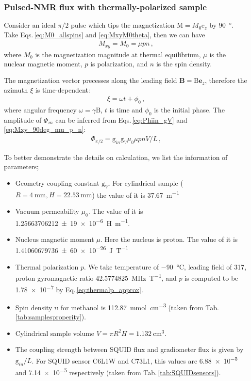 \subsubsection{Pulsed-NMR flux with thermally-polarized sample}

Consider an ideal $\pi/2$ pulse which tips the magnetization $\mathrm{M} = M_0 \mathrm{e}_z$ by \SI{90}{\degree}. Take Eqs.\,\eqref{eq:M0_allspins} and \eqref{eq:MxyM0theta}, then we can have
\begin{align}
    M_{xy} = M_0 = \mu p n\,,\label{eq:Mxy_90deg_mu_p_n}
\end{align}
where $M_0$ is the magnetization magnitude at thermal equilibrium, $\mu$ is the nuclear magnetic moment, $p$ is polarization, and $n$ is the spin density. 

The magnetization vector precesses along the leading field $\mathbf{B} = \mathrm{B} \mathbf{e}_z$, therefore the azimuth $\xi$ is time-dependent:
\begin{align}
    \xi = \omega t + \phi_0\,,
\end{align}
where angular frequency $\omega = \gamma \mathrm{B}$, $t$ is time and $\phi_0$ is the initial phase. The amplitude of $\Phi_{in}$ can be inferred from Eqs.\,\eqref{eq:Phiin_gV} and \eqref{eq:Mxy_90deg_mu_p_n}:
\begin{align}
	\Phi_{\pi/2} = \mathrm{g}_{in} \mathrm{g}_V \mu_0 \mu p n V / L\,, \label{eq:Phiin_gV_pNMR}
\end{align}

To better demonstrate the details on calculation, we list the information of parameters;
\begin{itemize}
    \item Geometry coupling constant $\mathrm{g}_V$. For cylindrical sample ($R=\SI{4}{\mm}, H=\SI{22.53}{\mm}$) the value of it is \SI{37.67}{\meter^{-1}}
    \item Vacuum permeability $\mu_0$. The value of it is \SI{1.256 637 062 12(19)e-6}{\henry.\metre^{-1}}\cite{FUNDAMENTALCONSTANTS}. 
    \item Nucleus magnetic moment $\mu$. Here the nucleus is proton. The value of it is \SI{1.410 606 797 36(60)e-26}{\joule.\tesla^{-1}}\cite{FUNDAMENTALCONSTANTS}
    \item Thermal polarization $p$. We take temperature of \SI{-90}{\celsius}, leading field of \SI{317}{\gauss}, proton gyromagnetic ratio \SI{42.577 482 5}{\MHz. \tesla^{-1}}\cite{rumble2019crc}, and $p$ is computed to be \SI{1.78e-7}{} by Eq.\,\eqref{eq:thermalp_approx}. 
    \item Spin density $n$ for methanol is \SI{112.87}{\mmol.\cm^{-3}} (taken from Tab.\,\ref{tab:samplesproperity}). 
    \item Cylindrical sample volume $V = \pi R^2 H = \SI{1.132}{\cm^{3}}$. 
    \item The coupling strength between SQUID flux and gradiometer flux is given by $\mathrm{g}_{in} / L$. For SQUID sensor C6L1W and C73L1, this values are \SI{6.88e-5}{} and \SI{7.14e-5}{} respectively (taken from Tab.\,\ref{tab:SQUIDsensors}). 
\end{itemize}

